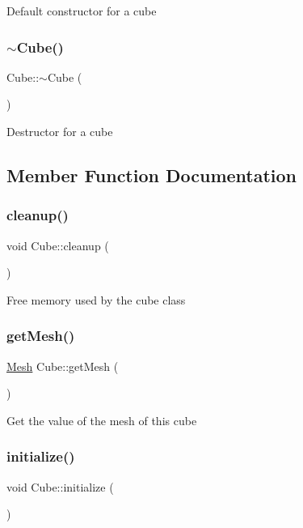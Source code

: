 Default constructor for a cube \mbox{\label{classCube_aa814e979cecb8c451fdb332ded2cea1e}} 
\subsubsection{\texorpdfstring{$\sim$\+Cube()}{~Cube()}}
{\footnotesize\ttfamily Cube\+::$\sim$\+Cube (\begin{DoxyParamCaption}{ }\end{DoxyParamCaption})}

Destructor for a cube 

\subsection{Member Function Documentation}
\mbox{\label{classCube_aacf58e77463b0a26b81c141aa036af08}} 
\subsubsection{\texorpdfstring{cleanup()}{cleanup()}}
{\footnotesize\ttfamily void Cube\+::cleanup (\begin{DoxyParamCaption}{ }\end{DoxyParamCaption})\hspace{0.3cm}{\ttfamily [static]}}

Free memory used by the cube class \mbox{\label{classCube_a16590bea0a2e21a9a068d9f17a5f9c59}} 
\subsubsection{\texorpdfstring{get\+Mesh()}{getMesh()}}
{\footnotesize\ttfamily \mbox{\hyperlink{structMesh}{Mesh}} Cube\+::get\+Mesh (\begin{DoxyParamCaption}{ }\end{DoxyParamCaption})}

Get the value of the mesh of this cube \mbox{\label{classCube_a612b349fc162d1c59dc8c45bcc33f93b}} 
\subsubsection{\texorpdfstring{initialize()}{initialize()}}
{\footnotesize\ttfamily void Cube\+::initialize (\begin{DoxyParamCaption}{ }\end{DoxyParamCaption})\hspace{0.3cm}{\ttfamily [static]}}

